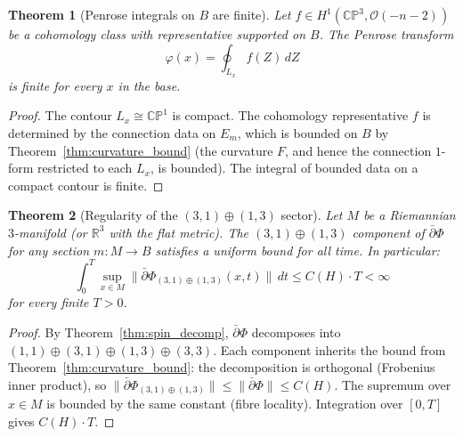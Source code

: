 \documentclass[11pt,a4paper]{article}
\newtheorem{theorem}{Theorem}[section]
\theoremstyle{definition}
\theoremstyle{remark}
\newcommand{\CP}{\mathbb{CP}}
\newcommand{\R}{\mathbb{R}}
\newcommand{\dbar}{\bar{\partial}}
\begin{document}
\begin{theorem}[Penrose integrals on $B$ are finite]\label{thm:penrose_finite}
Let $f\in H^1(\CP^3,\mathcal{O}(-n-2))$ be a cohomology class with representative supported on $B$. The Penrose transform
\begin{equation}
\varphi(x)=\oint_{L_x}f(Z)\,dZ
\end{equation}
is finite for every $x$ in the base.
\end{theorem}

\begin{proof}
The contour $L_x\cong\CP^1$ is compact. The cohomology representative $f$ is determined by the connection data on $E_m$, which is bounded on $B$ by Theorem~\ref{thm:curvature_bound} (the curvature $F$, and hence the connection $1$-form restricted to each $L_x$, is bounded). The integral of bounded data on a compact contour is finite.
\end{proof}

\begin{theorem}[Regularity of the $(3,1)\oplus(1,3)$ sector]\label{thm:regularity}
Let $M$ be a Riemannian $3$-manifold (or $\R^3$ with the flat metric). The $(3,1)\oplus(1,3)$ component of $\dbar\Phi$ for any section $m:M\to B$ satisfies a uniform bound for all time. In particular:
\begin{equation}\label{eq:bkm}
\int_0^T\!\sup_{x\in M}\|\dbar\Phi_{(3,1)\oplus(1,3)}(x,t)\|\,dt\leq C(H)\cdot T<\infty
\end{equation}
for every finite $T>0$.
\end{theorem}

\begin{proof}
By Theorem~\ref{thm:spin_decomp}, $\dbar\Phi$ decomposes into $(1,1)\oplus(3,1)\oplus(1,3)\oplus(3,3)$. Each component inherits the bound from Theorem~\ref{thm:curvature_bound}: the decomposition is orthogonal (Frobenius inner product), so $\|\dbar\Phi_{(3,1)\oplus(1,3)}\|\leq\|\dbar\Phi\|\leq C(H)$. The supremum over $x\in M$ is bounded by the same constant (fibre locality). Integration over $[0,T]$ gives $C(H)\cdot T$.
\end{proof}
\end{document}
